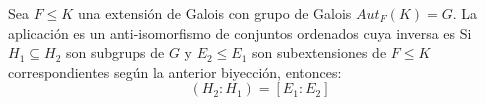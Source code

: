 
\begin{teo} %
    Sea $F\leq K$ una extensión de Galois con grupo de Galois $Aut_F(K) = G$. La aplicación 
    es un anti-isomorfismo de conjuntos ordenados cuya inversa es 
    Si $H_1\subseteq H_2$ son subgrups de $G$ y $E_2\leq E_1$ son subextensiones de $F\leq K$ correspondientes según la anterior biyección, entonces:
    \begin{equation*}
        (H_2:H_1) = [E_1:E_2]
    \end{equation*}
\end{teo}



